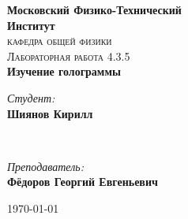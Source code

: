 \documentclass[a4paper, 12pt]{article}
\newenvironment{bottompar}{\par\vspace*{\fill}}{\clearpage}
\begin{document}
\begin{titlepage}

\newcommand{\HRule}{\rule{\linewidth}{0.5mm}} %

\center %
 

\textbf{\LARGE Московский Физико-Технический}
\\[5pt]
\textbf{\LARGE Институт}\\[1,5cm] %
\textsc{\Large кафедра общей физики}\\[0.5cm] %
\textsc{\large Лабораторная работа  4.3.5}\\[0.9cm] %




{ \huge \bfseries Изучение голограммы}
\\[1.7cm] %




 

\begin{minipage}{0.3\textwidth}
	\begin{flushleft} \large
		\emph{Студент:}\\
		\textbf{Шиянов Кирилл}%
	\end{flushleft}
\end{minipage}
~
\begin{minipage}{0.5\textwidth}
	\begin{flushright} \large
		\emph{Преподаватель:} \\
		\textbf{Фёдоров Георгий Евгеньевич} %
	\end{flushright}
\end{minipage}

\begin{bottompar}
	
	{\large \today}

\end{bottompar}
\vfill %

\end{titlepage}
\end{document}
